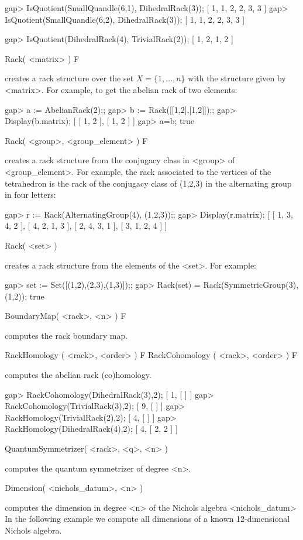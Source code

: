 \beginexample
gap> IsQuotient(SmallQuandle(6,1), DihedralRack(3));
[ 1, 1, 2, 2, 3, 3 ]
gap> IsQuotient(SmallQuandle(6,2), DihedralRack(3));
[ 1, 1, 2, 2, 3, 3 ]
\endexample

\beginexample
gap> IsQuotient(DihedralRack(4), TrivialRack(2));
[ 1, 2, 1, 2 ]
\endexample

\>Rack( <matrix> ) F

creates a rack structure over the set $X=\{1,...,n\}$ with the structure 
given by <matrix>. For example, to get the abelian rack of two elements:

\beginexample
gap> a := AbelianRack(2);;
gap> b := Rack([[1,2],[1,2]]);;
gap> Display(b.matrix); 
[ [  1,  2 ],
  [  1,  2 ] ]
gap> a=b;
true
\endexample

\>Rack( <group>, <group_element> ) F

creates a rack structure from the conjugacy class in <group> of 
<group_element>. For example, the rack associated to the 
vertices of the tetrahedron is the rack of the conjugacy class
of (1,2,3) in the alternating group in four letters:

\beginexample
gap> r := Rack(AlternatingGroup(4), (1,2,3));;
gap> Display(r.matrix);
[ [  1,  3,  4,  2 ],
  [  4,  2,  1,  3 ],
  [  2,  4,  3,  1 ],
  [  3,  1,  2,  4 ] ]
\endexample

\>Rack( <set> )

creates a rack structure from the elements of the <set>. For example:

\beginexample
gap> set := Set([(1,2),(2,3),(1,3)]);;
gap> Rack(set) = Rack(SymmetricGroup(3), (1,2));
true
\endexample

\>BoundaryMap( <rack>, <n> ) F 

computes the rack boundary map.

\>RackHomology ( <rack>, <order> ) F
\>RackCohomology ( <rack>, <order> ) F

computes the abelian rack (co)homology. 

\beginexample
gap> RackCohomology(DihedralRack(3),2);
[ 1, [  ] ]
gap> RackCohomology(TrivialRack(3),2); 
[ 9, [  ] ]
gap> RackHomology(TrivialRack(2),2);
[ 4, [  ] ]
gap> RackHomology(DihedralRack(4),2);    
[ 4, [ 2, 2 ] ]
\endexample

\> QuantumSymmetrizer( <rack>, <q>, <n> )

computes the quantum symmetrizer of degree <n>.

\> Dimension( <nichols_datum>, <n> )

computes the dimension in degree <n> of the Nichols algebra <nichols_datum> In
the following example we compute all dimensions of a known 12-dimensional
Nichols algebra.

